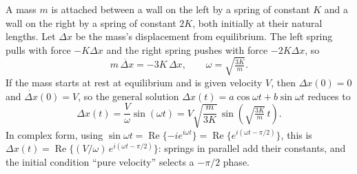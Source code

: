\begin{example}
A mass $m$ is attached between a wall on the left by a spring of constant $K$ and a wall on the right by a spring of constant $2K$, both initially at their natural lengths. Let $\Delta x$ be the mass's displacement from equilibrium. The left spring pulls with force $-K\Delta x$ and the right spring pushes with force $-2K\Delta x$, so
\begin{equation}
    m\,\ddot{\Delta x} = -3K\,\Delta x, \qquad \omega = \sqrt{\tfrac{3K}{m}}.
\end{equation}
If the mass starts at rest at equilibrium and is given velocity $V$, then $\Delta x(0) = 0$ and $\dot{\Delta x}(0) = V$, so the general solution $\Delta x(t) = a\cos\omega t + b\sin\omega t$ reduces to
\begin{equation}
    \Delta x(t) = \frac{V}{\omega}\sin(\omega t) = V\sqrt{\frac{m}{3K}}\,\sin\!\left(\sqrt{\tfrac{3K}{m}}\,t\right).
\end{equation}
In complex form, using $\sin\omega t = \operatorname{Re}\{-i e^{i\omega t}\} = \operatorname{Re}\{e^{i(\omega t - \pi/2)}\}$, this is $\Delta x(t) = \operatorname{Re}\{(V/\omega)\,e^{i(\omega t - \pi/2)}\}$: springs in parallel add their constants, and the initial condition ``pure velocity'' selects a $-\pi/2$ phase.
\end{example}
